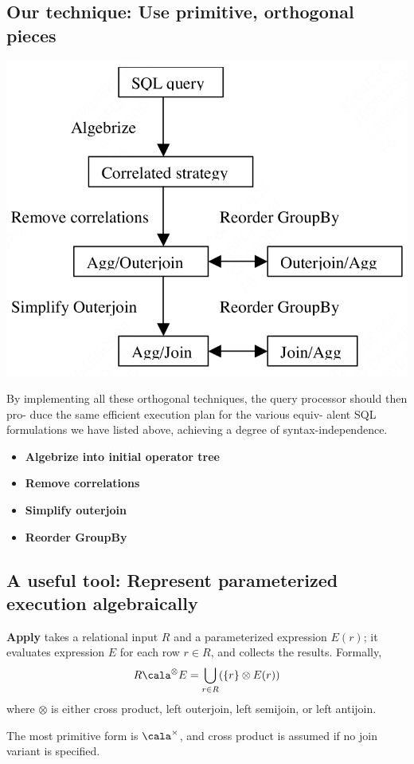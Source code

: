 \documentclass[11pt]{article}
\begin{document}
\subsection{Our technique: Use primitive, orthogonal pieces}
\label{sec:org246ed94}
\begin{center}
\includegraphics[width=.5\textwidth]{../../images/papers/95.png}
\end{center}

By implementing all these orthogonal techniques, the query processor should then pro- duce the same
efficient execution plan for the various equiv- alent SQL formulations we have listed above, achieving
a degree of syntax-independence.

\begin{itemize}
\item \textbf{Algebrize into initial operator tree}
\item \textbf{Remove correlations}
\item \textbf{Simplify outerjoin}
\item \textbf{Reorder GroupBy}
\end{itemize}
\subsection{A useful tool: Represent parameterized execution algebraically}
\label{sec:org6fc5651}
\textbf{Apply} takes a relational input \(R\) and a parameterized expression \(E(r)\); it evaluates expression
\(E\) for each row \(r\in R\), and collects the results. Formally,
\begin{equation*}
R\cala^{\otimes}E=\bigcup_{r\in R}(\{r\}\otimes E(r))
\end{equation*}
where \(\otimes\) is either cross product, left outerjoin, left semijoin, or left antijoin.

The most primitive form is \(\cala^\times\), and cross product is assumed if no join variant is
specified.
\end{document}
